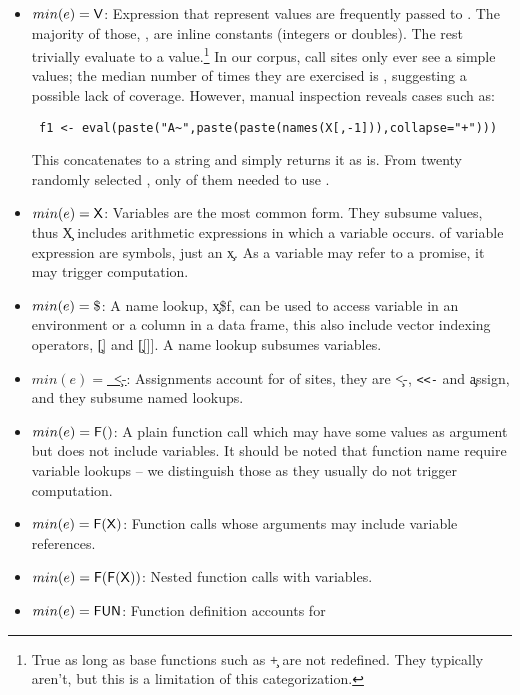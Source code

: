 \documentclass[screen,acmsmall]{acmart}
\begin{document}
\begin{itemize}
\item \underline{$min(e)={\sf V}$}: Expression that represent values are
  frequently passed to \eval. The majority of those, \packageValOneNodePercent,
  are inline constants (integers or doubles). The rest trivially evaluate to a
  value.\footnote{True as long as base functions such as \c{+} are not
  redefined. They typically aren't, but this is a limitation of this
  categorization.} In our corpus, \packageNbCallSitesUniqueActualValue call
  sites only ever see a simple values; the median number of times they are
  exercised is \packageMedianRunSitesUniqueActualValue, suggesting a possible
  lack of coverage. However, manual inspection reveals cases such as:
\begin{lstlisting}
 f1 <- eval(paste("A~",paste(paste(names(X[,-1])),collapse="+")))
\end{lstlisting}
  This concatenates to a string and \eval simply returns it as is.
  From twenty randomly selected \evals, only \packageUsefulValueEvalPercent of
  them needed to use \eval.
\item \underline{$min(e)={\sf X}$}: Variables are the most common form. They
  subsume values, thus \c{X} includes arithmetic expressions in which a variable
  occurs. \packageNbSymbolVarSitePercent of variable expression are symbols, \ie
  just an \c{x}. As a variable may refer to a promise, it may trigger
  computation.
\item \underline{$min(e)={\sf \$}$}: A name lookup, \c{x\$f}, can be used to
  access variable in an environment or a column in a data frame, this also
  include vector   indexing operators, \c{[]} and \c{[[]]}. A name lookup
  subsumes variables.
\item \underline{$min(e)=$~\c{<-}}: Assignments account for
  \packageAssignSitesPercent of \eval sites, they are \c{<-}, {\tt <<-} and
  \c{assign}, and they subsume named lookups.
\item \underline{$min(e)={\sf F()}$}: A plain function call which may have some
  values as argument but does not include variables. It should be noted that
  function name require variable lookups -- we distinguish those as they usually
  do not trigger computation.
\item \underline{$min(e)={\sf F(X)}$}: Function calls whose arguments may include
  variable references.
\item \underline{$min(e)={\sf F(F(X))}$}: Nested function calls with variables.
\item \underline{$min(e)={\sf FUN}$}: Function definition accounts for

\end{itemize}
\end{document}
